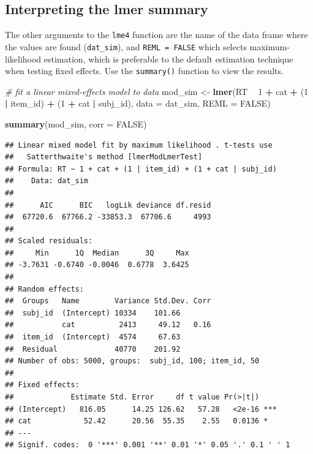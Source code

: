 \documentclass[doc,floatsintext]{apa6}
\newenvironment{Shaded}{\begin{snugshade}}{\end{snugshade}}
\newcommand{\CommentTok}[1]{\textcolor[rgb]{0.56,0.35,0.01}{\textit{#1}}}
\newcommand{\DataTypeTok}[1]{\textcolor[rgb]{0.13,0.29,0.53}{#1}}
\newcommand{\DecValTok}[1]{\textcolor[rgb]{0.00,0.00,0.81}{#1}}
\newcommand{\KeywordTok}[1]{\textcolor[rgb]{0.13,0.29,0.53}{\textbf{#1}}}
\newcommand{\NormalTok}[1]{#1}
\newcommand{\OperatorTok}[1]{\textcolor[rgb]{0.81,0.36,0.00}{\textbf{#1}}}
\newcommand{\OtherTok}[1]{\textcolor[rgb]{0.56,0.35,0.01}{#1}}
\newcommand{\StringTok}[1]{\textcolor[rgb]{0.31,0.60,0.02}{#1}}
\begin{document}
\hypertarget{interpreting-the-lmer-summary}{%
\subsection{Interpreting the lmer summary}\label{interpreting-the-lmer-summary}}

The other arguments to the \texttt{lme4} function are the name of the data frame where the values are found (\texttt{dat\_sim}), and \texttt{REML\ =\ FALSE} which selects maximum-likelihood estimation, which is preferable to the default estimation technique when testing fixed effects. Use the \texttt{summary()} function to view the results.

\begin{Shaded}
\begin{Highlighting}[]
\CommentTok{# fit a linear mixed-effects model to data}
\NormalTok{mod_sim <-}\StringTok{ }\KeywordTok{lmer}\NormalTok{(RT }\OperatorTok{~}\StringTok{ }\DecValTok{1} \OperatorTok{+}\StringTok{ }\NormalTok{cat }\OperatorTok{+}\StringTok{ }\NormalTok{(}\DecValTok{1} \OperatorTok{|}\StringTok{ }\NormalTok{item_id) }\OperatorTok{+}\StringTok{ }\NormalTok{(}\DecValTok{1} \OperatorTok{+}\StringTok{ }\NormalTok{cat }\OperatorTok{|}\StringTok{ }\NormalTok{subj_id),}
                \DataTypeTok{data =}\NormalTok{ dat_sim, }\DataTypeTok{REML =} \OtherTok{FALSE}\NormalTok{)}

\KeywordTok{summary}\NormalTok{(mod_sim, }\DataTypeTok{corr =} \OtherTok{FALSE}\NormalTok{)}
\end{Highlighting}
\end{Shaded}

\begin{verbatim}
## Linear mixed model fit by maximum likelihood . t-tests use
##   Satterthwaite's method [lmerModLmerTest]
## Formula: RT ~ 1 + cat + (1 | item_id) + (1 + cat | subj_id)
##    Data: dat_sim
## 
##      AIC      BIC   logLik deviance df.resid 
##  67720.6  67766.2 -33853.3  67706.6     4993 
## 
## Scaled residuals: 
##     Min      1Q  Median      3Q     Max 
## -3.7631 -0.6740 -0.0046  0.6778  3.6425 
## 
## Random effects:
##  Groups   Name        Variance Std.Dev. Corr
##  subj_id  (Intercept) 10334    101.66       
##           cat          2413     49.12   0.16
##  item_id  (Intercept)  4574     67.63       
##  Residual             40770    201.92       
## Number of obs: 5000, groups:  subj_id, 100; item_id, 50
## 
## Fixed effects:
##             Estimate Std. Error     df t value Pr(>|t|)    
## (Intercept)   816.05      14.25 126.62   57.28   <2e-16 ***
## cat            52.42      20.56  55.35    2.55   0.0136 *  
## ---
## Signif. codes:  0 '***' 0.001 '**' 0.01 '*' 0.05 '.' 0.1 ' ' 1
\end{verbatim}
\end{document}
